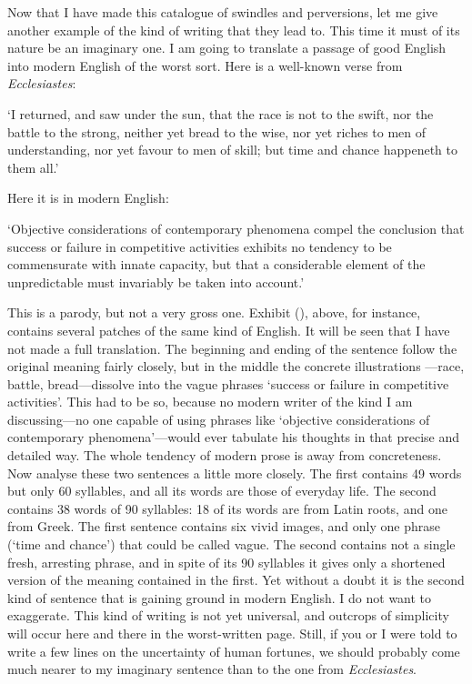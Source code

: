\vspace{1\baselineskip}

Now that I have made this catalogue of swindles and perversions, let
me give another example of the kind of writing that they lead to. This
time it must of its nature be an imaginary one. I am going to
translate a passage of good English into modern English of the worst
sort. Here is a well-known verse from \textit{Ecclesiastes}:

`I returned, and saw under the sun, that the race is not to the swift,
nor the battle to the strong, neither yet bread to the wise, nor yet
riches to men of understanding, nor yet favour to men of skill; but
time and chance happeneth to them all.'

Here it is in modern English:

`Objective considerations of contemporary phenomena compel the
conclusion that success or failure in competitive activities exhibits
no tendency to be commensurate with innate capacity, but that a
considerable element of the unpredictable must invariably be taken
into account.'

This is a parody, but not a very gross one. Exhibit (), above,
for instance, contains several patches of the same kind of English. It
will be seen that I have not made a full translation. The beginning
and ending of the sentence follow the original meaning fairly closely,
but in the middle the concrete illustrations ---race, battle,
bread---dissolve into the vague phrases `success or failure 
in competitive activities'. This had to be so, because no modern
writer of the kind I am discussing---no one capable of using phrases
like `objective considerations of contemporary phenomena'---would ever
tabulate his thoughts in that precise and detailed way. The whole
tendency of modern prose is away from concreteness. Now analyse these
two sentences a little more closely. The first contains 49 words but
only 60 syllables, and all its words are those of everyday life. The
second contains 38 words of 90 syllables: 18 of its words are from
Latin roots, and one from Greek. The first sentence contains six vivid
images, and only one phrase (`time and chance') that could be called
vague. The second contains not a single fresh, arresting phrase, and
in spite of its 90 syllables it gives only a shortened version of the
meaning contained in the first. Yet without a doubt it is the second
kind of sentence that is gaining ground in modern English. I do not
want to exaggerate. This kind of writing is not yet universal, and
outcrops of simplicity will occur here and there in the worst-written
page. Still, if you or I were told to write a few lines on the
uncertainty of human fortunes, we should probably come much nearer to
my imaginary sentence than to the one from \textit{Ecclesiastes}.

